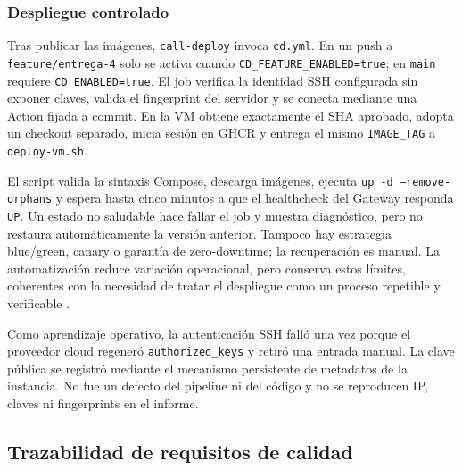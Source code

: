 \subsubsection{Despliegue controlado}

Tras publicar las imágenes, \texttt{call-deploy} invoca \texttt{cd.yml}. En un
push a \texttt{feature/entrega-4} solo se activa cuando
\texttt{CD\_FEATURE\_ENABLED=true}; en \texttt{main} requiere
\texttt{CD\_ENABLED=true}. El job verifica la identidad SSH configurada sin
exponer claves, valida el fingerprint del servidor y se conecta mediante una
Action fijada a commit. En la VM obtiene exactamente el SHA aprobado, adopta un
checkout separado, inicia sesión en GHCR y entrega el mismo \texttt{IMAGE\_TAG} a
\texttt{deploy-vm.sh}.

El script valida la sintaxis Compose, descarga imágenes, ejecuta
\texttt{up -d --remove-orphans} y espera hasta cinco minutos a que el healthcheck
del Gateway responda \texttt{UP}. Un estado no saludable hace fallar el job y
muestra diagnóstico, pero no restaura automáticamente la versión anterior. Tampoco
hay estrategia blue/green, canary o garantía de zero-downtime; la recuperación
es manual. La automatización reduce variación operacional, pero conserva estos
límites, coherentes con la necesidad de tratar el despliegue como un proceso
repetible y verificable \cite{farley2021modernsoftwareengineering}.

Como aprendizaje operativo, la autenticación SSH falló una vez porque el
proveedor cloud regeneró \texttt{authorized\_keys} y retiró una entrada manual.
La clave pública se registró mediante el mecanismo persistente de metadatos de la
instancia. No fue un defecto del pipeline ni del código y no se reproducen IP,
claves ni fingerprints en el informe.

\subsection{Trazabilidad de requisitos de calidad}
\label{subsec:trazabilidad-pruebas}

